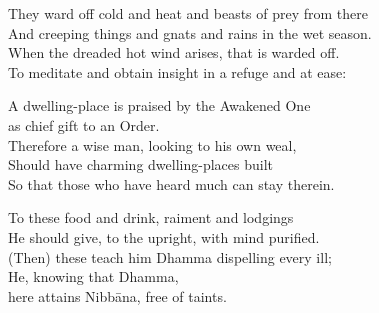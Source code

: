 \begin{english}
  \setlength{\parskip}{8pt}%
  They ward off cold and heat and beasts of prey from there\\
  And creeping things and gnats and rains in the wet season.\\
  When the dreaded hot wind arises, that is warded off.\\
  To meditate and obtain insight in a refuge and at ease:

  A dwelling-place is praised by the Awakened One\\\vin as chief gift to an Order.\\
  Therefore a wise man, looking to his own weal,\\
  Should have charming dwelling-places built\\
  So that those who have heard much can stay therein.

  To these food and drink, raiment and lodgings\\
  He should give, to the upright, with mind purified.\\
  (Then) these teach him Dhamma dispelling every ill;\\
  He, knowing that Dhamma,\\\vin here attains Nibbāna, free of taints.\\ 
\end{english}

%

